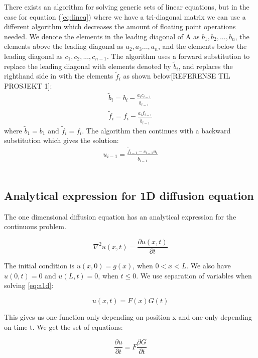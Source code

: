 \documentclass{article}
\begin{document}
There exists an algorithm for solving generic sets of linear equations, but in the case for equation (\ref{eq:lineq})  where we have a tri-diagonal matrix we can use a different algorithm which decreases the amount of floating point operations needed. We denote the elements in the leading diagonal of A as $b_1, b_2, ..., b_n$, the elements above the leading diagonal as $a_2, a_3 ..., a_n$, and the elements below the leading diagonal as $c_1, c_2, ..., c_{n-1}$. The algorithm uses a forward substitution to replace the leading diagonal with elements denoted by $\tilde{b}_i$, and replaces the righthand side in with the elements $\tilde{f}_i$ as shown below[REFERENSE TIL PROSJEKT 1]:
\begin{align*}
\tilde{b}_i=b_i-\frac{a_ic_{i-1}}{\tilde{b}_{i-1}} \\
\tilde{f}_i=f_i-\frac{a_i\tilde{f}_{i-1}}{\tilde{b}_{i-1}}
\end{align*}
where $\tilde{b}_1=b_1$ and $\tilde{f}_i=f_i$. The algorithm then continues with a backward substitution which gives the solution:
\begin{align}
u_{i-1}=\frac{\tilde{f}_{i-1}-c_{i-1}u_i}{\tilde{b}_{i-1}}
\end{align}
\\

\subsection{Analytical expression for 1D diffusion equation}

The one dimensional diffusion equation has an analytical expression for the continuous problem. 

\begin{equation}
\nabla ^2 u(x,t)=\frac{\partial u(x,t)}{\partial t}
\label{eq:a1d}
\end{equation}

The initial condition is $u(x,0)=g(x)$, when $0<x<L$. We also have $u(0,t)=0$ and $u(L,t)=0$, when $t\leq0$. We use separation of variables when solving \ref{eq:a1d}:

\begin{equation}
u(x,t) = F(x)G(t)
\label{eq:sep}
\end{equation}

This gives us one function only depending on position x and one only depending on time t. We get the set of equations:

\begin{equation*}
\frac{\partial u}{\partial t} = F \frac{\partial G}{\partial t}
\end{equation*}
\end{document}
